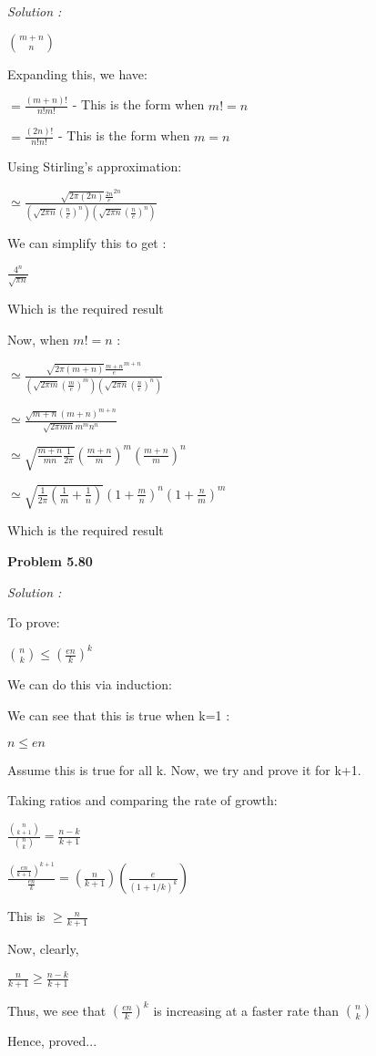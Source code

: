 \documentclass[12pt]{article}
\begin{document}
\textit {Solution :}

$\binom{m+n}{n}$

Expanding this, we have:

$= \frac{(m+n)!}{n!m!}$ - This is the form when $m!=n$

$= \frac{(2n)!}{n!n!}$ - This is the form when $m=n$

Using Stirling's approximation:

$\simeq \frac{\sqrt{2\pi (2n)}{\frac{2n}{e}}^{2n} }{(\sqrt{2\pi n} {(\frac{n}{e})}^n{})(\sqrt{2\pi n} {(\frac{n}{e})}^n{})}$

We can simplify this to get :

$\frac{4^n}{\sqrt{\pi n}}$

Which is the required result

Now, when $m!=n$ :

$\simeq \frac{\sqrt{2\pi (m+n)}{\frac{m+n}{e}}^{m+n} }{(\sqrt{2\pi m} {(\frac{m}{e})}^m{})(\sqrt{2\pi n} {(\frac{n}{e})}^n{})}$

$\simeq \frac{{\sqrt{m+n}}{(m+n)}^{m+n}}{{\sqrt{2\pi mn}}{m^m}{n^n}}$

$\simeq {\sqrt{{\frac{m+n}{mn}}{\frac{1}{2\pi}}}}{(\frac{m+n}{m})^m}{(\frac{m+n}{m})^n}$

$\simeq {\sqrt{{\frac{1}{2\pi}}({\frac{1}{m}}+{\frac{1}{n}})}}{(1+\frac{m}{n})^n}{(1+\frac{n}{m})^m}$

Which is the required result

\medskip

\medskip

\noindent
{\bf Problem 5.80}

\textit {Solution :}

To prove:

$\binom{n}{k} \leq (\frac{en}{k})^k$

We can do this via induction:

We can see that this is true when k=1 :

$n\leq en$

Assume this is true for all k. Now, we try and prove it for k+1.

Taking ratios and comparing the rate of growth:

$\frac{\binom{n}{k+1}}{\binom{n}{k}} = \frac{n-k}{k+1}$

$\frac{(\frac{en}{k+1})^{k+1}}{\frac{en}{k}} = (\frac{n}{k+1})(\frac{e}{(1+1/k)^k})$

This is $\geq \frac{n}{k+1}$

Now, clearly, 

$\frac{n}{k+1} \geq \frac{n-k}{k+1}$

Thus, we see that $(\frac{en}{k})^k$ is increasing at a faster rate than $\binom{n}{k}$

Hence, proved...
\end{document}
